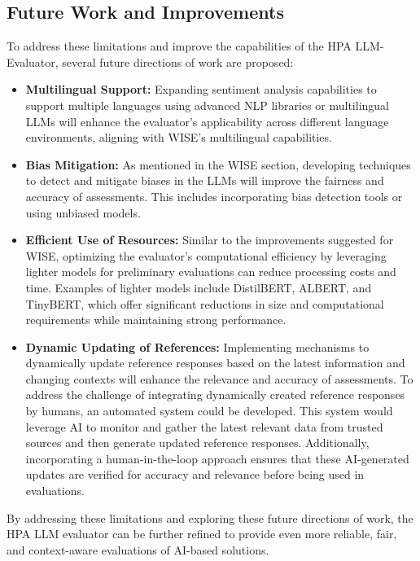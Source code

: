 \subsection{Future Work and Improvements}

To address these limitations and improve the capabilities of the HPA LLM-Evaluator, several future directions of work are proposed:

\begin{itemize}
    \item \textbf{Multilingual Support:} Expanding sentiment analysis capabilities to support multiple languages using advanced NLP libraries or multilingual LLMs will enhance the evaluator's applicability across different language environments, aligning with WISE's multilingual capabilities. \cite{abdullah2021multilingual}
    \item \textbf{Bias Mitigation:} As mentioned in the WISE section, developing techniques to detect and mitigate biases in the LLMs will improve the fairness and accuracy of assessments. This includes incorporating bias detection tools or using unbiased models. \cite{ferrara2023fairness}
    \item \textbf{Efficient Use of Resources:} Similar to the improvements suggested for WISE, optimizing the evaluator's computational efficiency by leveraging lighter models for preliminary evaluations can reduce processing costs and time. Examples of lighter models include DistilBERT, ALBERT, and TinyBERT, which offer significant reductions in size and computational requirements while maintaining strong performance. \cite{sanh2019distilbert} \cite{lan2019albert} \cite{jiao2019tinybert}
    \item \textbf{Dynamic Updating of References:} Implementing mechanisms to dynamically update reference responses based on the latest information and changing contexts will enhance the relevance and accuracy of assessments. To address the challenge of integrating dynamically created reference responses by humans, an automated system could be developed. This system would leverage AI to monitor and gather the latest relevant data from trusted sources and then generate updated reference responses. Additionally, incorporating a human-in-the-loop approach ensures that these AI-generated updates are verified for accuracy and relevance before being used in evaluations. \cite{wu2022survey}
\end{itemize}

By addressing these limitations and exploring these future directions of work, the HPA LLM evaluator can be further refined to provide even more reliable, fair, and context-aware evaluations of AI-based solutions.
